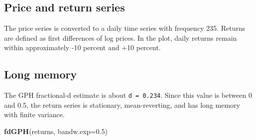 \documentclass[
  11pt,
]{article}
\newenvironment{Shaded}{\begin{snugshade}}{\end{snugshade}}
\newcommand{\AttributeTok}[1]{\textcolor[rgb]{0.13,0.29,0.53}{#1}}
\newcommand{\DecValTok}[1]{\textcolor[rgb]{0.00,0.00,0.81}{#1}}
\newcommand{\FloatTok}[1]{\textcolor[rgb]{0.00,0.00,0.81}{#1}}
\newcommand{\FunctionTok}[1]{\textcolor[rgb]{0.13,0.29,0.53}{\textbf{#1}}}
\newcommand{\NormalTok}[1]{#1}
\newcommand{\OtherTok}[1]{\textcolor[rgb]{0.56,0.35,0.01}{#1}}
\newcommand{\SpecialCharTok}[1]{\textcolor[rgb]{0.81,0.36,0.00}{\textbf{#1}}}
\newcommand{\StringTok}[1]{\textcolor[rgb]{0.31,0.60,0.02}{#1}}
\begin{document}
\subsection{Price and return series}\label{price-and-return-series}

The price series is converted to a daily time series with frequency 235.
Returns are defined as first differences of log prices. In the plot,
daily returns remain within approximately -10 percent and +10 percent.

\begin{Shaded}
\end{Shaded}

\subsection{Long memory}\label{long-memory}

The GPH fractional-d estimate is about \texttt{d\ =\ 0.234}. Since this
value is between 0 and 0.5, the return series is stationary,
mean-reverting, and has long memory with finite variance.

\begin{Shaded}
\begin{Highlighting}[]
\FunctionTok{fdGPH}\NormalTok{(returns, }\AttributeTok{bandw.exp=}\FloatTok{0.5}\NormalTok{)}
\end{Highlighting}
\end{Shaded}
\end{document}
